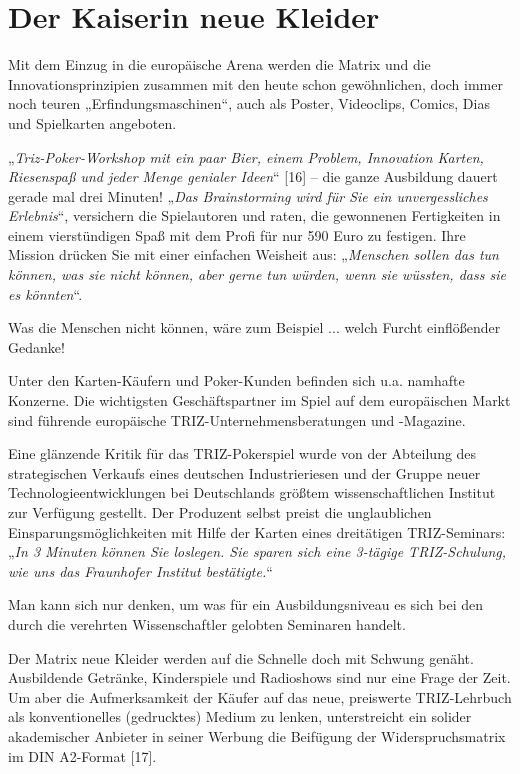 \documentclass[11pt,a4paper]{article}
\begin{document}
\section*{Der Kaiserin neue Kleider}
Mit dem Einzug in die europäische Arena werden die Matrix und die
Innovationsprinzipien zusammen mit den heute schon gewöhnlichen, doch immer
noch teuren „Erfindungsmaschinen“, auch als Poster, Videoclips, Comics, Dias
und Spielkarten angeboten.

„\emph{Triz-Poker-Workshop mit ein paar Bier, einem Problem, Innovation
  Karten, Riesenspaß und jeder Menge genialer Ideen}“ [16] – die ganze
Ausbildung dauert gerade mal drei Minuten! „\emph{Das Brainstorming wird für
  Sie ein unvergessliches Erlebnis}“, versichern die Spielautoren und raten,
die gewonnenen Fertigkeiten in einem vierstündigen Spaß mit dem Profi für nur
590 Euro zu festigen. Ihre Mission drücken Sie mit einer einfachen Weisheit
aus: „\emph{Menschen sollen das tun können, was sie nicht können, aber gerne
  tun würden, wenn sie wüssten, dass sie es könnten}“.

Was die Menschen nicht können, wäre zum Beispiel ... welch Furcht einflößender
Gedanke!

Unter den Karten-Käufern und Poker-Kunden befinden sich u.a. namhafte
Konzerne.  Die wichtigsten Geschäftspartner im Spiel auf dem europäischen
Markt sind führende europäische TRIZ-Unternehmensberatungen und -Magazine.

Eine glänzende Kritik für das TRIZ-Pokerspiel wurde von der Abteilung des
strategischen Verkaufs eines deutschen Industrieriesen und der Gruppe neuer
Technologieentwicklungen bei Deutschlands größtem wissenschaftlichen Institut
zur Verfügung gestellt. Der Produzent selbst preist die unglaublichen
Einsparungsmöglichkeiten mit Hilfe der Karten eines dreitätigen TRIZ-Seminars:
„\emph{In 3 Minuten können Sie loslegen. Sie sparen sich eine 3-tägige
  TRIZ-Schulung, wie uns das Fraunhofer Institut bestätigte.}“

Man kann sich nur denken, um was für ein Ausbildungsniveau es sich bei den
durch die verehrten Wissenschaftler gelobten Seminaren handelt.

Der Matrix neue Kleider werden auf die Schnelle doch mit Schwung genäht.
Ausbildende Getränke, Kinderspiele und Radioshows sind nur eine Frage der
Zeit. Um aber die Aufmerksamkeit der Käufer auf das neue, preiswerte
TRIZ-Lehrbuch als konventionelles (gedrucktes) Medium zu lenken, unterstreicht
ein solider akademischer Anbieter in seiner Werbung die Beifügung der
Widerspruchsmatrix im DIN A2-Format [17].
\end{document}
